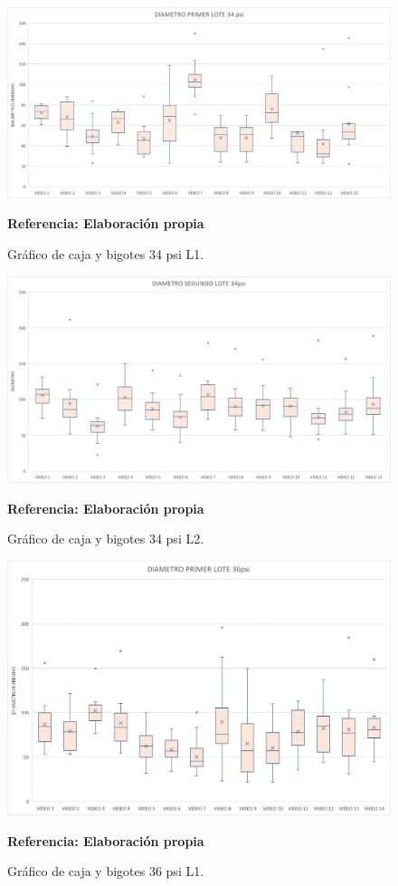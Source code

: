 \documentclass[12pt,twocolumn,a4paper]{article}
\begin{document}
\begin{figure}[h!]
	\centering
	\includegraphics[scale=0.3]{Diapro34L1.png}
	\caption{Gráfico de caja y bigotes 34 psi L1.} \textbf{Referencia: Elaboración propia} 
	\label{diapro34L1}
\end{figure}

\begin{figure}[h!]
	\centering
	\includegraphics[scale=0.3]{Diapro34L2.png}
	\caption{Gráfico de caja y bigotes 34 psi L2.} \textbf{Referencia: Elaboración propia} 
	\label{diapro34L2}
\end{figure}

\begin{figure}[h!]
	\centering
	\includegraphics[scale=0.35]{Diapro36L1.png}
	\caption{Gráfico de caja y bigotes 36 psi L1.} \textbf{Referencia: Elaboración propia} 
	\label{diapro36L1}
\end{figure}
\end{document}
